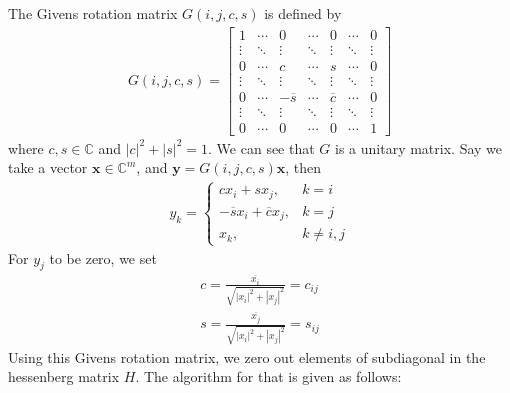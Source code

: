 \documentclass[12pt]{article}
\numberwithin{equation}{section}
\newcommand{\vecb}[1]{\mathbf{#1}}
\newcommand{\brak}[1]{\ensuremath{\left(#1\right)}}
\newcommand{\defvec}[2]{\vecb{#1}\in\mathbb{C}^{#2}}
\newcommand{\abs}[1]{\left\vert#1\right\vert}
\begin{document}
The Givens rotation matrix $G\brak{i, j, c, s}$ is defined by
\begin{align}
G\brak{i, j, c, s} = \begin{bmatrix}
1 & \cdots & 0 & \cdots & 0 & \cdots & 0 \\
\vdots & \ddots & \vdots & \ddots & \vdots & \ddots & \vdots \\
0 & \cdots & c & \cdots & s & \cdots & 0 \\
\vdots & \ddots & \vdots & \ddots & \vdots & \ddots & \vdots \\
0 & \cdots & -\overline{s} & \cdots & \overline{c} & \cdots & 0 \\
\vdots & \ddots & \vdots & \ddots & \vdots & \ddots & \vdots \\
0 & \cdots & 0 & \cdots & 0 & \cdots & 1
\end{bmatrix}
\end{align}
where $c, s \in \mathbb{C}$ and $\abs{c}^2 + \abs{s}^2 = 1$.
We can see that $G$ is a unitary matrix. 
\newline
Say we take a vector $\defvec{x}{m}$, and $\vecb{y} = G\brak{i, j, c, s}\vecb{x}$, then
\begin{align}
    y_k = \begin{cases}
        c x_i + s x_j, & k = i \\
        -\overline{s} x_i + \overline{c} x_j, & k = j \\
        x_k, & k \neq i, j
    \end{cases}
\end{align}
For $y_j$ to be zero, we set
\begin{align}
    c = \frac{\overline{x_i}}{\sqrt{\abs{x_i}^2 + \abs{x_j}^2}} = c_{ij}\\
    s = \frac{\overline{x_j}}{\sqrt{\abs{x_i}^2 + \abs{x_j}^2}} = s_{ij}
\end{align}
Using this Givens rotation matrix, we zero out elements of subdiagonal in the hessenberg matrix $H$.
The algorithm for that is given as follows:
\end{document}
